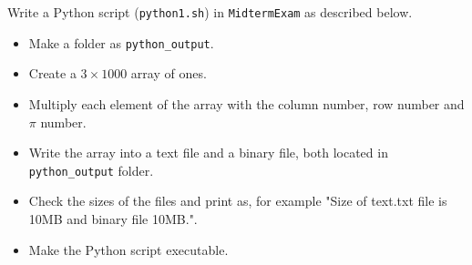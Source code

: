 \question[25]

Write a Python script (\texttt{python1.sh}) in \texttt{MidtermExam} as described below.
\begin{itemize}
\item Make a folder as \texttt{python\_output}.
\item Create a $3\times1000$ array of ones.
\item Multiply each element of the array with the column number, row number and $\pi$ number.
\item Write the array into a text file and a binary file, both located in \texttt{python\_output} folder.
\item Check the sizes of the files and print as, for example "Size of text.txt file is 10MB and binary file 10MB.".
\item Make the Python script executable.
\end{itemize}


